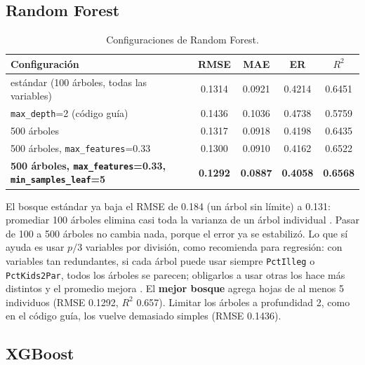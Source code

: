 \documentclass[11pt,a4paper]{article}
\let\citepOriginal\citep
\renewcommand*{\citep}[1]{\textbf{\citepOriginal{#1}}}%
\let\citetOriginal\citet
\renewcommand*{\citet}[1]{\textbf{\citetOriginal{#1}}}%
\begin{document}
\subsection{Random Forest}

\begin{table}[H]
\centering
\small
\caption{Configuraciones de Random Forest.}
\begin{tabular}{lcccc}
\toprule
Configuración & RMSE & MAE & ER & $R^2$ \\
\midrule
estándar (100 árboles, todas las variables) & 0.1314 & 0.0921 & 0.4214 & 0.6451 \\
\texttt{max\_depth}=2 (código guía) & 0.1436 & 0.1036 & 0.4738 & 0.5759 \\
500 árboles & 0.1317 & 0.0918 & 0.4198 & 0.6435 \\
500 árboles, \texttt{max\_features}=0.33 & 0.1300 & 0.0910 & 0.4162 & 0.6522 \\
\textbf{500 árboles, \texttt{max\_features}=0.33, \texttt{min\_samples\_leaf}=5} & \textbf{0.1292} & \textbf{0.0887} & \textbf{0.4058} & \textbf{0.6568} \\
\bottomrule
\end{tabular}
\end{table}

El bosque estándar ya baja el RMSE de 0.184 (un árbol sin límite) a 0.131: promediar 100 árboles elimina casi toda la varianza de un árbol individual \citep{breiman2001}. Pasar de 100 a 500 árboles no cambia nada, porque el error ya se estabilizó. Lo que sí ayuda es usar $p/3$ variables por división, como recomienda \citet{breiman2001} para regresión: con variables tan redundantes, si cada árbol puede usar siempre \texttt{PctIlleg} o \texttt{PctKids2Par}, todos los árboles se parecen; obligarlos a usar otras los hace más distintos y el promedio mejora \citep{probst2019}. El \textbf{mejor bosque} agrega hojas de al menos 5 individuos (RMSE 0.1292, $R^2$ 0.657). Limitar los árboles a profundidad 2, como en el código guía, los vuelve demasiado simples (RMSE 0.1436).

\subsection{XGBoost}
\end{document}
